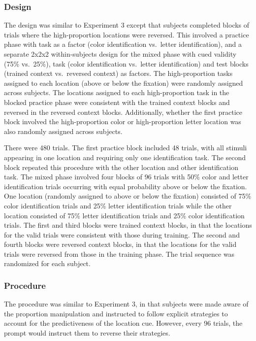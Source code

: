 \documentclass[]{DissertateCUNY}
\begin{document}
\hypertarget{design-3}{%
\subsubsection{Design}\label{design-3}}

The design was similar to Experiment 3 except that subjects completed
blocks of trials where the high-proportion locations were reversed. This
involved a practice phase with task as a factor (color identification
vs.~letter identification), and a separate 2x2x2 within-subjects design
for the mixed phase with cued validity (75\% vs.~25\%), task (color
identification vs.~letter identification) and test blocks (trained
context vs.~reversed context) as factors. The high-proportion tasks
assigned to each location (above or below the fixation) were randomly
assigned across subjects. The locations assigned to each high-proportion
task in the blocked practice phase were consistent with the trained
context blocks and reversed in the reversed context blocks.
Additionally, whether the first practice block involved the
high-proportion color or high-proportion letter location was also
randomly assigned across subjects.

There were 480 trials. The first practice block included 48 trials, with
all stimuli appearing in one location and requiring only one
identification task. The second block repeated this procedure with the
other location and other identification task. The mixed phase involved
four blocks of 96 trials with 50\% color and letter identification
trials occurring with equal probability above or below the fixation. One
location (randomly assigned to above or below the fixation) consisted of
75\% color identification trials and 25\% letter identification trials
while the other location consisted of 75\% letter identification trials
and 25\% color identification trials. The first and third blocks were
trained context blocks, in that the locations for the valid trials were
consistent with those during training. The second and fourth blocks were
reversed context blocks, in that the locations for the valid trials were
reversed from those in the training phase. The trial sequence was
randomized for each subject.

\hypertarget{procedure-3}{%
\subsubsection{Procedure}\label{procedure-3}}

The procedure was similar to Experiment 3, in that subjects were made
aware of the proportion manipulation and instructed to follow explicit
strategies to account for the predictiveness of the location cue.
However, every 96 trials, the prompt would instruct them to reverse
their strategies.
\end{document}

